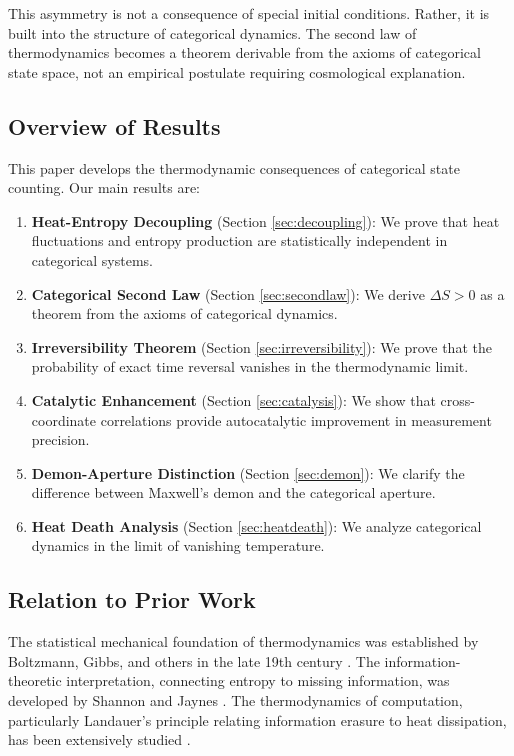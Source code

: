 This asymmetry is not a consequence of special initial conditions. Rather, it is built into the structure of categorical dynamics. The second law of thermodynamics becomes a theorem derivable from the axioms of categorical state space, not an empirical postulate requiring cosmological explanation.

\subsection{Overview of Results}

This paper develops the thermodynamic consequences of categorical state counting. Our main results are:

\begin{enumerate}
    \item \textbf{Heat-Entropy Decoupling} (Section \ref{sec:decoupling}): We prove that heat fluctuations and entropy production are statistically independent in categorical systems.

    \item \textbf{Categorical Second Law} (Section \ref{sec:secondlaw}): We derive $\Delta S > 0$ as a theorem from the axioms of categorical dynamics.

    \item \textbf{Irreversibility Theorem} (Section \ref{sec:irreversibility}): We prove that the probability of exact time reversal vanishes in the thermodynamic limit.

    \item \textbf{Catalytic Enhancement} (Section \ref{sec:catalysis}): We show that cross-coordinate correlations provide autocatalytic improvement in measurement precision.

    \item \textbf{Demon-Aperture Distinction} (Section \ref{sec:demon}): We clarify the difference between Maxwell's demon and the categorical aperture.

    \item \textbf{Heat Death Analysis} (Section \ref{sec:heatdeath}): We analyze categorical dynamics in the limit of vanishing temperature.
\end{enumerate}

\subsection{Relation to Prior Work}

The statistical mechanical foundation of thermodynamics was established by Boltzmann, Gibbs, and others in the late 19th century \cite{boltzmann1896,gibbs1902}. The information-theoretic interpretation, connecting entropy to missing information, was developed by Shannon and Jaynes \cite{shannon1948,jaynes1957}. The thermodynamics of computation, particularly Landauer's principle relating information erasure to heat dissipation, has been extensively studied \cite{landauer1961,bennett1982,bennett2003}.


